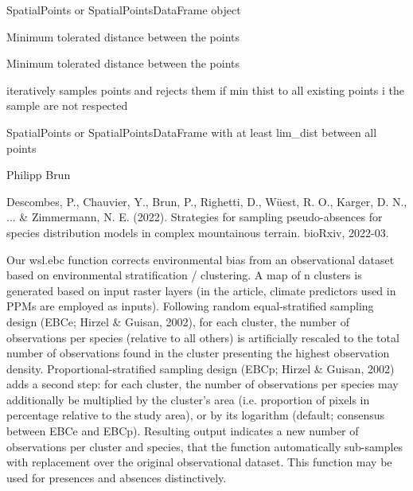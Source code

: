 \documentclass[a4paper]{book}
\begin{document}
%
\begin{Arguments}
\begin{ldescription}
\item[\code{spdf}] SpatialPoints or SpatialPointsDataFrame object

\item[\code{lim\_dist}] Minimum tolerated distance between the points

\item[\code{n\_tot}] Minimum tolerated distance between the points
\end{ldescription}
\end{Arguments}
%
\begin{Details}\relax
iteratively samples points and rejects them if min thist
to all existing points i the sample are not respected
\end{Details}
%
\begin{Value}
SpatialPoints or SpatialPointsDataFrame with at least
lim\_dist between all points
\end{Value}
%
\begin{Author}\relax
Philipp Brun
\end{Author}
%
\begin{References}\relax
Descombes, P., Chauvier, Y., Brun, P., Righetti, D., Wüest, R. O., Karger, D. N., ... \&
Zimmermann, N. E. (2022). Strategies for sampling pseudo-absences for species distribution
models in complex mountainous terrain. bioRxiv, 2022-03.
\end{References}
%
\begin{Description}\relax
Our wsl.ebc function corrects environmental bias from an observational dataset based on
environmental stratification / clustering. A map of n clusters is generated based on input
raster layers (in the article, climate predictors used in PPMs are employed as inputs).
Following random equal-stratified sampling design (EBCe; Hirzel \& Guisan, 2002), for each
cluster, the number of observations per species (relative to all others) is artificially
rescaled to the total number of observations found in the cluster presenting the highest
observation density. Proportional-stratified sampling design (EBCp; Hirzel \& Guisan, 2002)
adds a second step: for each cluster, the number of observations per species may additionally
be multiplied by the cluster's area (i.e. proportion of pixels in percentage relative to the
study area), or by its logarithm (default; consensus between EBCe and EBCp). Resulting output
indicates a new number of observations per cluster and species, that the function automatically
sub-samples with replacement over the original observational dataset. This function may be used
for presences and absences distinctively.
\end{Description}
\end{document}
